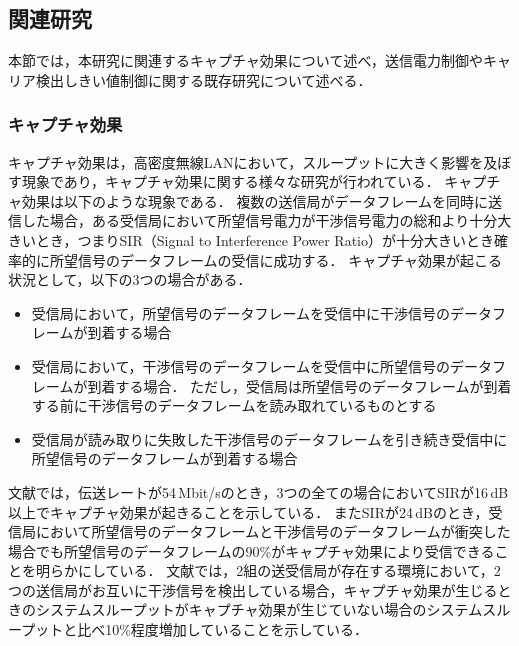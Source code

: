 \documentclass[master]{kuisthesis}		%
\begin{document}
\subsection{関連研究}
本節では，本研究に関連するキャプチャ効果について述べ，送信電力制御やキャリア検出しきい値制御に関する既存研究について述べる．
\subsubsection{キャプチャ効果}\label{キャプチャ効果}
キャプチャ効果は，高密度無線LANにおいて，スループットに大きく影響を及ぼす現象であり，キャプチャ効果に関する様々な研究が行われている\cite{capture_effect_in_IEEE,exploiting_the_capture}．
キャプチャ効果は以下のような現象である．
複数の送信局がデータフレームを同時に送信した場合，ある受信局において所望信号電力が干渉信号電力の総和より十分大きいとき，つまりSIR（Signal to Interference Power Ratio）が十分大きいとき確率的に所望信号のデータフレームの受信に成功する\cite{capture_effect_throughput}．
キャプチャ効果が起こる状況として，以下の3つの場合がある\cite{wintech2007}．
\begin{itemize}
\item 受信局において，所望信号のデータフレームを受信中に干渉信号のデータフレームが到着する場合
\item 受信局において，干渉信号のデータフレームを受信中に所望信号のデータフレームが到着する場合．
ただし，受信局は所望信号のデータフレームが到着する前に干渉信号のデータフレームを読み取れているものとする
\item 受信局が読み取りに失敗した干渉信号のデータフレームを引き続き受信中に所望信号のデータフレームが到着する場合
\end{itemize}
文献\cite{wintech2007}では，伝送レートが54\,Mbit/sのとき，3つの全ての場合においてSIRが16\,dB以上でキャプチャ効果が起きることを示している．
またSIRが24\,dBのとき，受信局において所望信号のデータフレームと干渉信号のデータフレームが衝突した場合でも所望信号のデータフレームの90\%がキャプチャ効果により受信できることを明らかにしている．
文献\cite{capture_effect_throughput}では，2組の送受信局が存在する環境において，2つの送信局がお互いに干渉信号を検出している場合，キャプチャ効果が生じるときのシステムスループットがキャプチャ効果が生じていない場合のシステムスループットと比べ10\%程度\cite{capture_effect_throughput}増加していることを示している．
\end{document}
